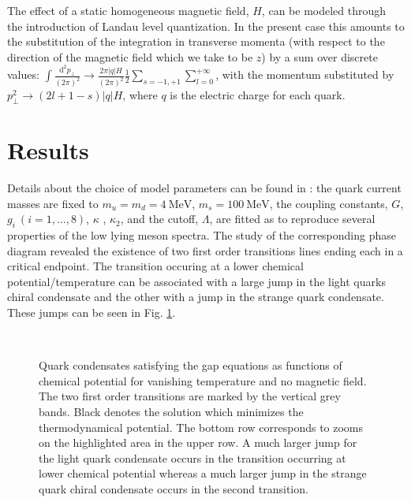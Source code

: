 \documentclass{PoS}
\begin{document}
The effect of a static homogeneous magnetic field, $H$, can be modeled through the introduction of Landau level quantization. In the present case this amounts to the substitution of the integration in transverse momenta (with respect to the direction of the magnetic field which we take to be $z$) by a sum over discrete values:
$  \int\frac{\mathrm{d}^2p_\perp}{\left(2\pi\right)^2}
  \rightarrow \frac{2\pi\left|q\right|H}{\left(2\pi\right)^2} \frac{1}{2}\sum_{s=-1,+1}\sum_{l=0}^{+\infty}$, with the momentum substituted by 
 	$p^2_\perp\rightarrow (2 l+1-s)\left|q\right| H$, where $q$ is the electric charge for each quark.

\section{Results}

Details about the choice of model parameters can be found in \cite{NJLH8qmPD_PRD91_2015}: the quark current masses are fixed to $m_u=m_d=4~\mathrm{MeV}$, $m_s=100~\mathrm{MeV}$, the coupling constants, $G$, $g_i~(i=1,\ldots,8)$, $\kappa$ , $\kappa_2$, and the cutoff, $\Lambda$, are fitted as to reproduce several properties of the low lying meson spectra. The study of the corresponding phase diagram revealed the existence of two first order transitions lines ending each in a critical endpoint. The transition occuring at a lower chemical potential/temperature can be associated with a large jump in the light quarks chiral condensate and the other with a jump in the strange quark condensate. These jumps can be seen in Fig. \ref{grafhiT0Hq0000}.

\begin{figure}
\centering
\\
\caption{
\label{grafhiT0Hq0000} 
Quark condensates satisfying the gap equations as functions of chemical potential for vanishing temperature and no magnetic field. The two first order transitions are marked by the vertical grey bands. Black denotes the solution which minimizes the thermodynamical potential. The bottom row corresponds to zooms on the highlighted area in the upper row. A much larger jump for the light quark condensate occurs in the transition occurring at lower chemical potential whereas a much larger jump in the strange quark chiral condensate occurs in the second transition.}
\end{figure}
\end{document}
